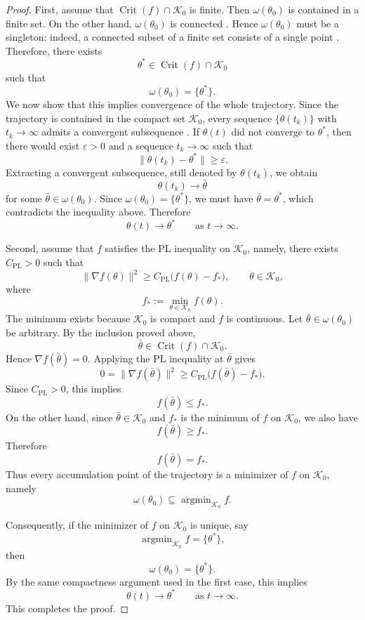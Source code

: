 \documentclass{article} %
\begin{document}
\begin{proof}
First, assume that $\operatorname{Crit}(f)\cap\mathcal K_0$ is finite. Then $\omega(\theta_0)$ is contained in a finite set. On the other hand, $\omega(\theta_0)$ is connected \cite[Lemma~6.6]{Teschl2012}. Hence $\omega(\theta_0)$ must be a singleton: indeed, a connected subset of a finite set consists of a single point \cite[Definition~2.45, p.~42]{Rudin1976}. Therefore, there exists
\[
    \theta^*\in\operatorname{Crit}(f)\cap\mathcal K_0
\]
such that
\[
    \omega(\theta_0)=\{\theta^*\}.
\]
We now show that this implies convergence of the whole trajectory. Since the trajectory is contained in the compact set $\mathcal K_0$, every sequence $\{\theta(t_k)\}$ with $t_k\to\infty$ admits a convergent subsequence \cite[Theorem~3.6(a)]{Rudin1976}. If $\theta(t)$ did not converge to $\theta^*$, then there would exist $\varepsilon>0$ and a sequence
$t_k\to\infty$ such that
\[
    \|\theta(t_k)-\theta^*\|\ge\varepsilon .
\]
Extracting a convergent subsequence, still denoted by $\theta(t_k)$, we obtain
\[
    \theta(t_k)\to\bar\theta
\]
for some $\bar\theta\in\omega(\theta_0)$. Since $\omega(\theta_0)=\{\theta^*\}$, we must have $\bar\theta=\theta^*$, which contradicts the inequality above. Therefore
\[
    \theta(t)\to\theta^*
    \qquad \text{as } t\to\infty .
\]

Second, assume that $f$ satisfies the PL inequality on $\mathcal K_0$, namely, there exists $C_{\mathrm{PL}}>0$ such that
\[
    \|\nabla f(\theta)\|^2
    \ge
    C_{\mathrm{PL}}\bigl(f(\theta)-f_*\bigr),
    \qquad \theta\in\mathcal K_0,
\]
where
\[
    f_*:=\min_{\theta\in\mathcal K_0} f(\theta).
\]
The minimum exists because $\mathcal K_0$ is compact and $f$ is continuous. Let $\bar\theta\in\omega(\theta_0)$ be arbitrary. By the inclusion proved above,
\[
    \bar\theta\in\operatorname{Crit}(f)\cap\mathcal K_0.
\]
Hence $\nabla f(\bar\theta)=0$. Applying the PL inequality at $\bar\theta$ gives
\[
    0
    =
    \|\nabla f(\bar\theta)\|^2
    \ge
    C_{\mathrm{PL}}\bigl(f(\bar\theta)-f_*\bigr).
\]
Since $C_{\mathrm{PL}}>0$, this implies
\[
    f(\bar\theta)\le f_*.
\]
On the other hand, since $\bar\theta\in\mathcal K_0$ and $f_*$ is the minimum of
$f$ on $\mathcal K_0$, we also have
\[
    f(\bar\theta)\ge f_*.
\]
Therefore
\[
    f(\bar\theta)=f_*.
\]
Thus every accumulation point of the trajectory is a minimizer of $f$ on
$\mathcal K_0$, namely
\[
    \omega(\theta_0)\subseteq \operatorname{argmin}_{\mathcal K_0} f.
\]

Consequently, if the minimizer of $f$ on $\mathcal K_0$ is unique, say
\[
    \operatorname{argmin}_{\mathcal K_0} f=\{\theta^*\},
\]
then
\[
    \omega(\theta_0)=\{\theta^*\}.
\]
By the same compactness argument used in the first case, this implies
\[
    \theta(t)\to\theta^*
    \qquad \text{as } t\to\infty .
\]
This completes the proof.
\end{proof}
\end{document}
